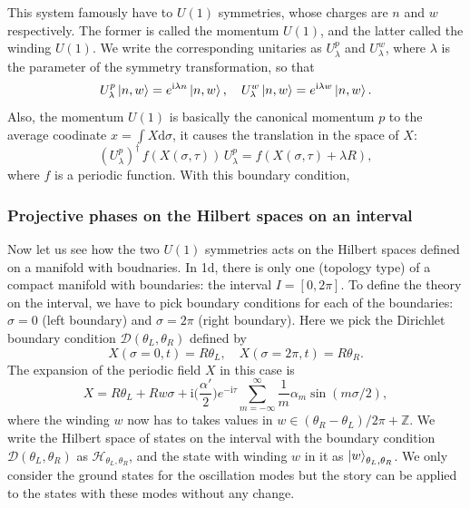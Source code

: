 \documentclass[
]{scrartcl}
\numberwithin{equation}{section}
\theoremstyle{definition}
\theoremstyle{definition}
\theoremstyle{definition}
\theoremstyle{definition}
\theoremstyle{remark}
\begin{document}
This system famously have to \(U(1)\) symmetries, whose charges are \(n\) and \(w\) respectively. The former is called the momentum \(U(1)\), and the latter called the winding \(U(1)\).
We write the corresponding unitaries as \(U^p_\lambda\) and \(U^w_\lambda\), where \(\lambda\) is the parameter of the symmetry transformation, so that
\begin{equation}
    \label{eq:UpwAct}
    U^p_\lambda \ket{n,w} = e^{\mathrm{i}\lambda n }\ket{n,w},\quad
    U^w_\lambda \ket{n,w} = e^{\mathrm{i}\lambda w }\ket{n,w}.
\end{equation}
Also, the momentum \(U(1)\) is basically the canonical momentum \(p\) to the average coodinate \(x = \int X \mathrm{d}\sigma\), it causes the translation in the space of \(X\):
\begin{equation}
    \label{eq:UpActX}
    (U^p_{\lambda})^\dagger\, f(X(\sigma,\tau)) \, U^p_{\lambda} = 
    f(X(\sigma,\tau) + \lambda R),
\end{equation}
where \(f\) is a periodic function.
With this boundary condition,

\hypertarget{projective-phases-on-the-hilbert-spaces-on-an-interval}{%
\subsubsection{Projective phases on the Hilbert spaces on an interval}\label{projective-phases-on-the-hilbert-spaces-on-an-interval}}

Now let us see how the two \(U(1)\) symmetries acts on the Hilbert spaces defined on a manifold with boudnaries. In 1d, there is only one (topology type) of a compact manifold with boundaries: the interval \(I = [0,2\pi]\).
To define the theory on the interval, we have to pick boundary conditions for each of the boundaries: \(\sigma =0\) (left boundary) and \(\sigma =2\pi\) (right boundary).
Here we pick the Dirichlet boundary condition \(\mathcal{D}(\theta_L,\theta_R)\)
defined by
\begin{equation}
    \label{eq:Dirichlet}
    X(\sigma = 0,t) = R \theta_L, \quad X(\sigma = 2\pi, t)= R \theta_R.
\end{equation}
The expansion of the periodic field \(X\) in this case is
\begin{equation}
    \label{eq:XexpDirichlet}
    X = R\theta_L + R w \sigma + \mathrm{i}\bigl(\frac{\alpha'}{2}\bigr) e^{-\mathrm{i}\tau} \sum_{m = -\infty}^{\infty}  \frac1m \alpha_m \sin(m \sigma/2),
\end{equation}
where the winding \(w\) now has to takes values in \(w \in (\theta_R-\theta_L)/2\pi + \mathbb{Z}\).
We write the Hilbert space of states on the interval with the boundary condition \(\mathcal{D}(\theta_L,\theta_R)\) as \(\mathcal{H}_{\theta_L,\theta_R}\), and the state with winding \(w\) in it as \(\ket{w}_{\theta_L,\theta_R}\). We only consider the ground states for the oscillation modes but the story can be applied to the states with these modes without any change.
\end{document}
